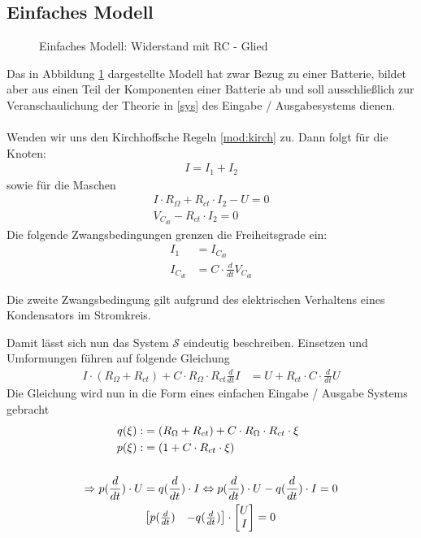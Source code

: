 \subsection{Einfaches Modell}
\begin{figure}[ht]
	\centering
	\def\svgwidth{0.9\columnwidth}
	
	\caption{Einfaches Modell: Widerstand mit RC - Glied}
	\label{fig:einfachModell}
\end{figure}
Das in Abbildung \ref{fig:einfachModell} dargestellte Modell hat zwar Bezug zu einer Batterie, bildet aber aus einen Teil der Komponenten einer Batterie ab und soll ausschließlich zur Veranschaulichung der Theorie in \ref{sys} des Eingabe / Ausgabesystems dienen. \\\\
Wenden wir uns den Kirchhoffsche Regeln \ref{mod:kirch} zu. Dann folgt für die Knoten:
\begin{align}
	I = I_1 + I_2
\end{align}
sowie für die Maschen
\begin{align}
	I \cdot R_\Omega + R_{ct} \cdot I_2 - U = 0	\\
	V_{C_{dl}} - R_{ct} \cdot I_2 = 0
\end{align}
Die folgende Zwangsbedingungen grenzen die Freiheitsgrade ein:
\begin{align}
I_1 &= I_{C_{dl}} \\
I_{C_{dl}} &=  C \cdot \frac{d}{dt} V_{C_{dl}}
\end{align}
\begin{bem}
Die zweite Zwangsbedingung gilt aufgrund des elektrischen Verhaltens eines Kondensators im Stromkreis.
\end{bem}
Damit lässt sich nun das System $\mathscr{S}$ eindeutig beschreiben. Einsetzen und Umformungen führen auf folgende Gleichung
\begin{align}
I\cdot (R_{\Omega} + R_{ct}) + C \cdot R_{\Omega} \cdot R_{ct} \frac{d}{dt} I &= U + R_{ct} \cdot C \cdot \frac{d}{dt} U 
\end{align}
Die Gleichung wird nun in die Form eines einfachen Eingabe  / Ausgabe Systems gebracht
\begin{align}
q(\xi):&=(R_{\Omega} + R_{ct})+C \cdot R_{\Omega} \cdot R_{ct} \cdot \xi\\
p(\xi):&=(1+C\cdot R_{ct}\cdot \xi) \\\notag\\
\Rightarrow p(\frac{d}{dt}) \cdot U &= q(\frac{d}{dt})\cdot I
\Leftrightarrow p(\frac{d}{dt}) \cdot U - q(\frac{d}{dt})\cdot I = 0\\
&\begin{bmatrix}
p(\frac{d}{dt}) & -q(\frac{d}{dt})
\end{bmatrix}
\cdot 
\begin{bmatrix}
U \\ 
I
\end{bmatrix}
= 0
\end{align}
